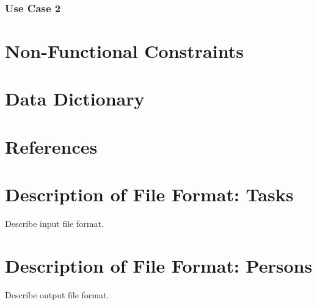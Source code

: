 \documentclass[12pt]{article}
\begin{document}
\subsubsection{Use Case 2} \label{uc:2}

\clearpage

\section{Non-Functional Constraints}

\clearpage

\section{Data Dictionary}

\clearpage

\section{References}

\appendix

\section{Description of File Format: Tasks}

Describe input file format.

\section{Description of File Format: Persons}

Describe output file format.
\end{document}
